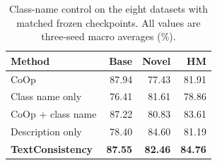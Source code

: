 \begin{table}[t]
\centering
\caption{Class-name control on the eight datasets with matched frozen checkpoints. All values are three-seed macro averages (\%).}
\label{tab:class_name_control}
\small
\setlength{\tabcolsep}{7pt}
\begin{tabular}{lrrr}
\toprule
Method & Base & Novel & HM \\
\midrule
CoOp & 87.94 & 77.43 & 81.91 \\
Class name only & 76.41 & 81.61 & 78.86 \\
CoOp + class name & 87.22 & 80.83 & 83.61 \\
Description only & 78.40 & 84.60 & 81.19 \\
\textbf{TextConsistency} & \textbf{87.55} & \textbf{82.46} & \textbf{84.76} \\
\bottomrule
\end{tabular}
\end{table}
